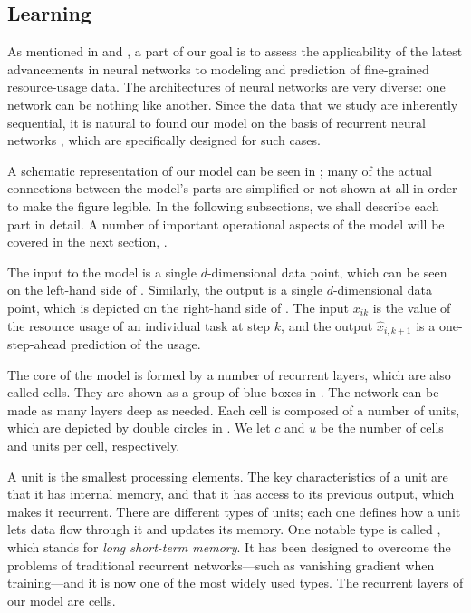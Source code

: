 \subsection{Learning}

As mentioned in  and , a part of our goal is to
assess the applicability of the latest advancements in neural networks
\cite{goodfellow2016} to modeling and prediction of fine-grained resource-usage
data. The architectures of neural networks are very diverse: one network can be
nothing like another. Since the data that we study are inherently sequential, it
is natural to found our model on the basis of recurrent neural networks
\cite{goodfellow2016}, which are specifically designed for such cases.

A schematic representation of our model can be seen in ; many of the
actual connections between the model's parts are simplified or not shown at all
in order to make the figure legible. In the following subsections, we shall
describe each part in detail. A number of important operational aspects of the
model will be covered in the next section, .

The input to the model is a single $d$-dimensional data point, which can be seen
on the left-hand side of . Similarly, the output is a single
$d$-dimensional data point, which is depicted on the right-hand side of
. The input $x_{ik}$ is the value of the resource usage of an
individual task at step $k$, and the output $\hat{x}_{i,k + 1}$ is a
one-step-ahead prediction of the usage.

The core of the model is formed by a number of recurrent layers, which are also
called cells. They are shown as a group of blue boxes in . The
network can be made as many layers deep as needed. Each cell is composed of a
number of units, which are depicted by double circles in . We let
$c$ and $u$ be the number of cells and units per cell, respectively.

A unit is the smallest processing elements. The key characteristics of a unit
are that it has internal memory, and that it has access to its previous output,
which makes it recurrent. There are different types of units; each one defines
how a unit lets data flow through it and updates its memory. One notable type is
called  \cite{hochreiter1997}, which stands for \emph{long short-term
memory}. It has been designed to overcome the problems of traditional recurrent
networks---such as vanishing gradient when training---and it is now one of the
most widely used types. The recurrent layers of our model are  cells.

